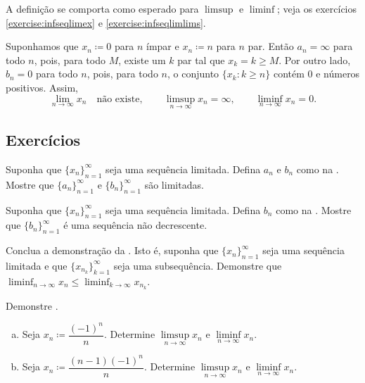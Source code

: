 A definição se comporta como esperado para
$\limsup$ e $\liminf$; veja os exercícios \ref{exercise:infseqlimex}
e \ref{exercise:infseqlimlims}.

\begin{example}
Suponhamos que
$x_n \coloneqq 0$ para $n$ ímpar e $x_n \coloneqq n$ para $n$ par.
Então $a_n = \infty$ para todo $n$, pois, para todo $M$,
existe um $k$ par tal que $x_k = k \geq M$.
Por outro lado, $b_n = 0$ para todo $n$, pois,
para todo $n$, o conjunto
$\{ x_k : k \geq n \}$ contém $0$ e números positivos.
Assim,
\begin{equation*}
\lim_{n\to \infty} x_n \quad \text{não existe},
\qquad
\limsup_{n\to \infty} x_n = \infty ,
\qquad
\liminf_{n\to \infty} x_n = 0.
\end{equation*}
\end{example}

\subsection{Exercícios}

\begin{exercise}
Suponha que $\{ x_n \}_{n=1}^\infty$ seja uma sequência limitada. Defina $a_n$ e
$b_n$ como na . Mostre que $\{ a_n \}_{n=1}^\infty$
e $\{ b_n \}_{n=1}^\infty$ são limitadas.
\end{exercise}

\begin{exercise}
Suponha que $\{ x_n \}_{n=1}^\infty$ seja uma sequência limitada.
Defina $b_n$ como na . Mostre que
$\{ b_n \}_{n=1}^\infty$ é uma sequência não decrescente.
\end{exercise}

\begin{exercise}
Conclua a demonstração da . Isto é,
suponha que $\{ x_n \}_{n=1}^\infty$ seja uma sequência limitada e
que $\{ x_{n_k} \}_{k=1}^\infty$ seja uma subsequência. Demonstre que
$\displaystyle \liminf_{n\to\infty} x_n \leq
\liminf_{k\to\infty} x_{n_k}$.
\end{exercise}

\begin{exercise}
Demonstre .
\end{exercise}

\begin{exercise}
\leavevmode
\begin{enumerate}[a)]
\item
Seja $x_n \coloneqq \dfrac{{(-1)}^n}{n}$.
Determine $\limsup\limits_{n\to\infty} x_n$ e $\liminf\limits_{n\to\infty} x_n$.
\item
Seja $x_n \coloneqq \dfrac{(n-1){(-1)}^n}{n}$.
Determine $\limsup\limits_{n\to\infty} x_n$ e $\liminf\limits_{n\to\infty} x_n$.
\end{enumerate}
\end{exercise}


